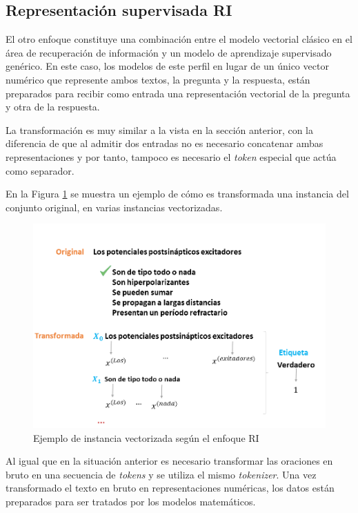 \subsection{Representación supervisada RI}

El otro enfoque constituye una combinación entre el modelo vectorial clásico en el área de recuperación de información y un modelo de aprendizaje supervisado genérico.  En este caso, los modelos de este perfil en lugar de un único vector numérico que represente ambos textos, la pregunta y la respuesta, están preparados para recibir como entrada una representación vectorial de la pregunta y otra de la respuesta.

La transformación es muy similar a la vista en la sección anterior, con la diferencia de que al admitir dos entradas no es necesario concatenar ambas representaciones y por tanto, tampoco es necesario el \textit{token} especial que actúa como separador.

En la Figura \ref{vect_2} se muestra un ejemplo de cómo es transformada una instancia del conjunto original, en varias instancias vectorizadas. 

\begin{figure}[!tb]
  \begin{center}
    \includegraphics[angle=0, width=1\textwidth]{Graphics/vect_2.png}
  \end{center}
    \caption{Ejemplo de instancia vectorizada según el enfoque RI}\label{vect_2}
\end{figure}

Al igual que en la situación anterior es necesario transformar las oraciones en bruto en una secuencia de \textit{tokens} y se utiliza el mismo \textit{tokenizer}.
Una vez transformado el texto en bruto en representaciones numéricas, los datos están preparados para ser tratados por los modelos matemáticos.   


